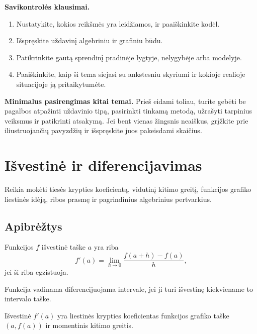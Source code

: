 \textbf{Savikontrolės klausimai.}
\begin{enumerate}[label=\arabic*.]
\item Nustatykite, kokios reikšmės yra leidžiamos, ir paaiškinkite kodėl.
\item Išspręskite uždavinį algebriniu ir grafiniu būdu.
\item Patikrinkite gautą sprendinį pradinėje lygtyje, nelygybėje arba modelyje.
\item Paaiškinkite, kaip ši tema siejasi su ankstesniu skyriumi ir kokioje realioje situacijoje ją pritaikytumėte.
\end{enumerate}

\textbf{Minimalus pasirengimas kitai temai.} Prieš eidami toliau, turite gebėti be pagalbos atpažinti uždavinio tipą, pasirinkti tinkamą metodą, užrašyti tarpinius veiksmus ir patikrinti atsakymą. Jei bent vienas žingsnis neaiškus, grįžkite prie iliustruojančių pavyzdžių ir išspręskite juos pakeisdami skaičius.

\section{Išvestinė ir diferencijavimas}\label{sec:isvestine-ir-diferencijavimas}

\begin{tcolorbox}[title=Prieš pradedant, colback=green!5]
Reikia mokėti tiesės krypties koeficientą, vidutinį kitimo greitį, funkcijos grafiko liestinės idėją, ribos prasmę ir pagrindinius algebrinius pertvarkius.
\end{tcolorbox}
\subsection{Apibrėžtys}

\begin{apibreztis}
Funkcijos $f$ išvestinė taške $a$ yra riba
\[
f'(a)=\lim_{h\to0}\frac{f(a+h)-f(a)}{h},
\]
jei ši riba egzistuoja.
\end{apibreztis}

\begin{apibreztis}
Funkcija vadinama diferencijuojama intervale, jei ji turi išvestinę kiekviename to intervalo taške.
\end{apibreztis}

\begin{pastaba}
Išvestinė $f'(a)$ yra liestinės krypties koeficientas funkcijos grafiko taške $(a,f(a))$ ir momentinis kitimo greitis.
\end{pastaba}

